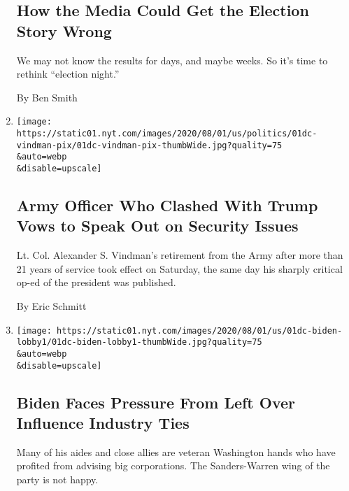 \begin{enumerate}
  \hypertarget{how-the-media-could-get-the-election-story-wrong}{%
  \subsection{How the Media Could Get the Election Story
  Wrong}\label{how-the-media-could-get-the-election-story-wrong}}

  We may not know the results for days, and maybe weeks. So it's time to
  rethink ``election night.''

  By Ben Smith
\item
  \href{/2020/08/01/us/politics/alexander-vindman-impeachment-trump.html}{}

  \texttt{[image: https://static01.nyt.com/images/2020/08/01/us/politics/01dc-vindman-pix/01dc-vindman-pix-thumbWide.jpg?quality=75\\\&auto=webp\\\&disable=upscale]}

  \hypertarget{army-officer-who-clashed-with-trump-vows-to-speak-out-on-security-issues}{%
  \subsection{Army Officer Who Clashed With Trump Vows to Speak Out on
  Security
  Issues}\label{army-officer-who-clashed-with-trump-vows-to-speak-out-on-security-issues}}

  Lt. Col. Alexander S. Vindman's retirement from the Army after more
  than 21 years of service took effect on Saturday, the same day his
  sharply critical op-ed of the president was published.

  By Eric Schmitt
\item
  \href{/2020/08/01/us/politics/biden-lobbyist-ties.html}{}

  \texttt{[image: https://static01.nyt.com/images/2020/08/01/us/01dc-biden-lobby1/01dc-biden-lobby1-thumbWide.jpg?quality=75\\\&auto=webp\\\&disable=upscale]}

  \hypertarget{biden-faces-pressure-from-left-over-influence-industry-ties}{%
  \subsection{Biden Faces Pressure From Left Over Influence Industry
  Ties}\label{biden-faces-pressure-from-left-over-influence-industry-ties}}

  Many of his aides and close allies are veteran Washington hands who
  have profited from advising big corporations. The Sanders-Warren wing
  of the party is not happy.


\end{enumerate}
